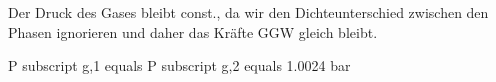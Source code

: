 Der Druck des Gases bleibt const., da wir den Dichteunterschied zwischen den Phasen ignorieren und daher das Kräfte GGW gleich bleibt.  

P subscript g,1 equals P subscript g,2 equals 1.0024 bar